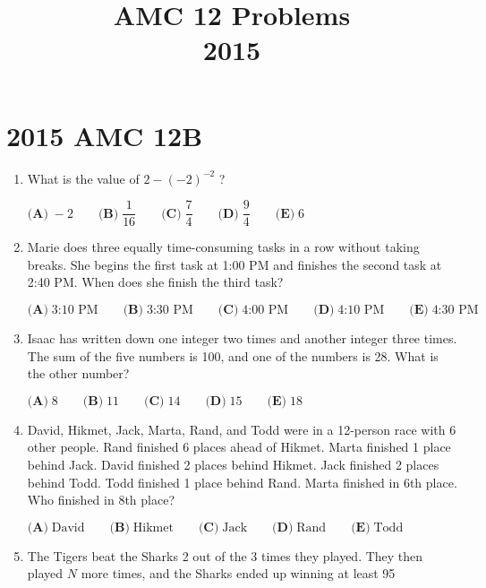 \documentclass{article}
\title{AMC 12 Problems \\ 2015}
\date{}
\begin{document}
\maketitle\thispagestyle{fancy}\newpage\section*{2015 AMC 12B}\begin{enumerate}[label=\arabic*., itemsep=0.5em]\item What is the value of \(2-(-2)^{-2}\) ?

\(\textbf{(A)}\; -2 \qquad\textbf{(B)}\; \dfrac{1}{16} \qquad\textbf{(C)}\; \dfrac{7}{4} \qquad\textbf{(D)}\; \dfrac{9}{4} \qquad\textbf{(E)}\; 6\)\par \vspace{0.5em}\item Marie does three equally time-consuming tasks in a row without taking breaks. She begins the first task at 1:00 PM and finishes the second task at 2:40 PM. When does she finish the third task?

\(\textbf{(A)}\; \text{3:10 PM} \qquad\textbf{(B)}\; \text{3:30 PM} \qquad\textbf{(C)}\; \text{4:00 PM} \qquad\textbf{(D)}\; \text{4:10 PM} \qquad\textbf{(E)}\; \text{4:30 PM}\)\par \vspace{0.5em}\item Isaac has written down one integer two times and another integer three times. The sum of the five numbers is 100, and one of the numbers is 28. What is the other number?

\(\textbf{(A)}\; 8 \qquad\textbf{(B)}\; 11 \qquad\textbf{(C)}\; 14 \qquad\textbf{(D)}\; 15 \qquad\textbf{(E)}\; 18\)\par \vspace{0.5em}\item David, Hikmet, Jack, Marta, Rand, and Todd were in a 12-person race with 6 other people. Rand finished 6 places ahead of Hikmet. Marta finished 1 place behind Jack. David finished 2 places behind Hikmet. Jack finished 2 places behind Todd. Todd finished 1 place behind Rand. Marta finished in 6th place. Who finished in 8th place?

\(\textbf{(A)}\; \text{David} \qquad\textbf{(B)}\; \text{Hikmet} \qquad\textbf{(C)}\; \text{Jack} \qquad\textbf{(D)}\; \text{Rand} \qquad\textbf{(E)}\; \text{Todd}\)\par \vspace{0.5em}\item The Tigers beat the Sharks 2 out of the 3 times they played. They then played \(N\) more times, and the Sharks ended up winning at least 95%


\end{enumerate}
\end{document}
